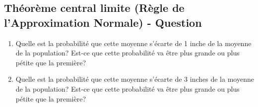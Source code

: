 \documentclass[
]{article}
\providecommand{\tightlist}{%
  \setlength{\itemsep}{0pt}\setlength{\parskip}{0pt}}
\begin{document}
\hypertarget{thuxe9oruxe8me-central-limite-ruxe8gle-de-lapproximation-normale---question}{%
\subsection{Théorème central limite (Règle de l'Approximation Normale) -
Question}\label{thuxe9oruxe8me-central-limite-ruxe8gle-de-lapproximation-normale---question}}

\begin{enumerate}
\def\labelenumi{\arabic{enumi}.}
\tightlist
\item
  Quelle est la probabilité que cette moyenne s'écarte de 1 inche de la
  moyenne de la population? Est-ce que cette probabilité va être plus
  grande ou plus pétite que la première?
\item
  Quelle est la probabilité que cette moyenne s'écarte de 3 inches de la
  moyenne de la population? Est-ce que cette probabilité va être plus
  grande ou plus pétite que la première?
\end{enumerate}
\end{document}
